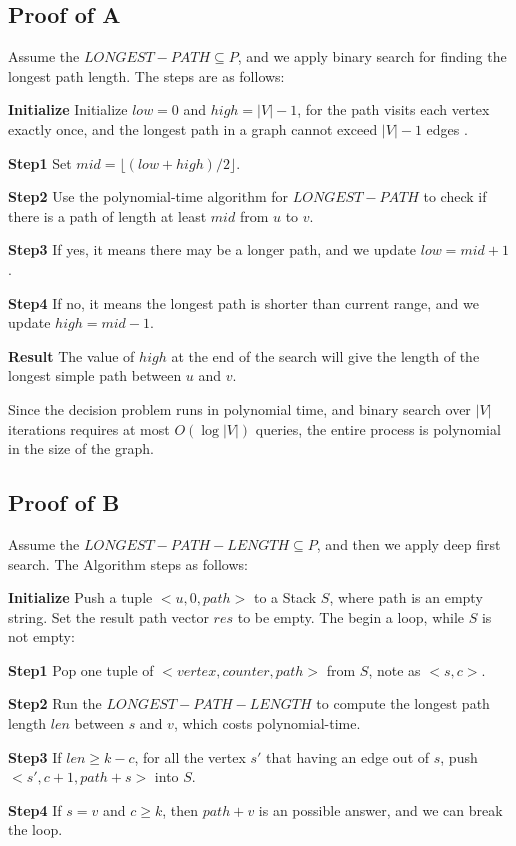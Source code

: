 \documentclass[12pt]{article}
\begin{document}
\subsection{Proof of A}
Assume the $LONGEST-PATH \subseteq P$, and we apply binary search for finding the longest path length. The steps are as follows:

\textbf{Initialize} Initialize $low = 0$ and $high = |V| - 1$, for the path visits each vertex exactly once, and the longest path in a graph cannot exceed $|V| - 1$ edges . 

\textbf{Step1} Set $mid = \lfloor (low + high) / 2 \rfloor$.

\textbf{Step2} Use the polynomial-time algorithm for $LONGEST-PATH$ to check if there is a path of length at least $mid$ from $u$ to $v$.

\textbf{Step3} If yes, it means there may be a longer path, and we update $low = mid + 1$.

\textbf{Step4} If no, it means the longest path is shorter than current range, and we update $high = mid - 1$.

\textbf{Result} The value of $high$ at the end of the search will give the length of the longest simple path between $u$ and $v$.

Since the decision problem runs in polynomial time, and binary search over $|V|$ iterations requires at most $O(\log |V|)$ queries, the entire process is polynomial in the size of the graph.

\subsection{Proof of B}
Assume the $LONGEST-PATH-LENGTH \subseteq P$, and then we apply deep first search. The Algorithm steps as follows:
 
\textbf{Initialize} Push a tuple $<u, 0, path>$ to a Stack $S$, where path is an empty string. Set the result path vector $res$ to be empty. The begin a loop, while $S$ is not empty:

\textbf{Step1} Pop one tuple of $<vertex, counter, path>$ from $S$, note as $<s, c>$. 

\textbf{Step2} Run the $LONGEST-PATH-LENGTH$ to compute the longest path length $len$ between $s$ and $v$, which costs polynomial-time.

\textbf{Step3} If $len \geq k-c$, for all the vertex $s'$ that having an edge out of $s$, push $<s', c+1, path+s>$ into $S$.

\textbf{Step4} If $s = v$ and $c \ge k$, then $path + v$ is an possible answer, and we can break the loop.   
\end{document}
